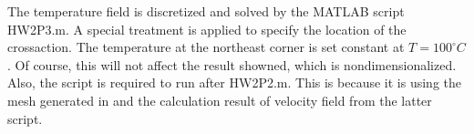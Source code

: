\documentclass[a4paper,10pt]{report}
\begin{document}
The temperature field is discretized and solved by the MATLAB script HW2P3.m. A special treatment is 
applied to specify the location of the crossaction. The temperature at the northeast corner is 
set constant at $ T = 100 ^\circ C $. Of course, this will not affect the result showned, which is nondimensionalized. 
Also, the script is required to run after HW2P2.m. This is because it is using the mesh generated in and the calculation 
result of velocity field from the latter script. 
\end{document}
